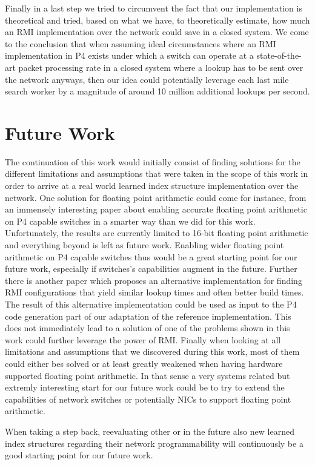 Finally in a last step we tried to circumvent the fact that our implementation is theoretical and tried, based on what we have, to theoretically estimate, how much an RMI implementation over the network could save in a closed system. We come to the conclusion that when assuming ideal circumstances where an RMI implementation in P4 exists under which a switch can operate at a state-of-the-art packet processing rate in a closed system where a lookup has to be sent over the network anyways, then our idea could potentially leverage each last mile search worker by a magnitude of around 10 million additional lookups per second.

\section{Future Work}
The continuation of this work would initially consist of finding solutions for the different limitations and assumptions that were taken in the scope of this work in order to arrive at a real world learned index structure implementation over the network. One solution for floating point arithmetic could come for instance, from an immensely interesting paper \cite{netfc} about enabling accurate floating point arithmetic on P4 capable switches in a smarter way than we did for this work. Unfortunately, the results are currently limited to 16-bit floating point arithmetic and everything beyond is left as future work. Enabling wider floating point arithmetic on P4 capable switches thus would be a great starting point for our future work, especially if switches's capabilities augment in the future. Further there is another paper \cite{maltry2021critical} which proposes an alternative implementation for finding RMI configurations that yield similar lookup times and often better build times. The result of this alternative implementation could be used as input to the P4 code generation part of our adaptation of the reference implementation. This does not immediately lead to a solution of one of the problems shown in this work could further leverage the power of RMI. Finally when looking at all limitations and assumptions that we discovered during this work, most of them could either bes solved or at least greatly weakened when having hardware supported floating point arithmetic. In that sense a very systems related but extremly interesting start for our future work could be to try to extend the capabilities of network switches or potentially NICs to support floating point arithmetic.

When taking a step back, reevaluating other or in the future also new learned index structures regarding their network programmability will continuously be a good starting point for our future work.
